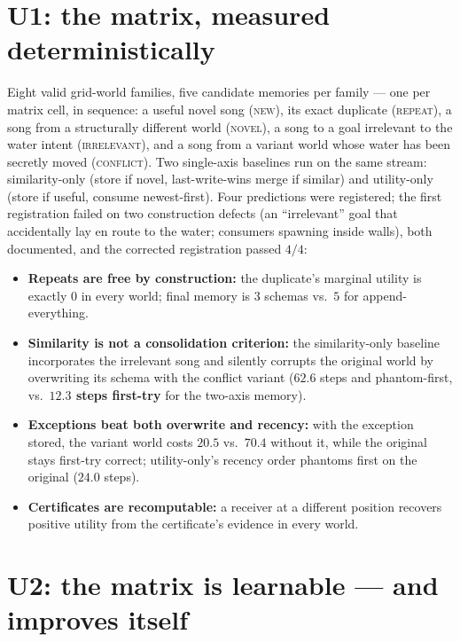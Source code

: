 \documentclass{article}
\begin{document}
\section{U1: the matrix, measured deterministically}
\label{p5:sec:u1}

Eight valid grid-world families, five candidate memories per family
--- one per matrix cell, in sequence: a useful novel song
(\textsc{new}), its exact duplicate (\textsc{repeat}), a song from a
structurally different world (\textsc{novel}), a song to a goal
irrelevant to the water intent (\textsc{irrelevant}), and a song from
a variant world whose water has been secretly moved
(\textsc{conflict}). Two single-axis baselines run on the same
stream: similarity-only (store if novel, last-write-wins merge if
similar) and utility-only (store if useful, consume newest-first).
Four predictions were registered; the first registration failed on
two construction defects (an ``irrelevant'' goal that accidentally
lay en route to the water; consumers spawning inside walls), both
documented, and the corrected registration passed $4/4$:

\begin{itemize}[leftmargin=16pt,itemsep=2pt,topsep=2pt]
\item \textbf{Repeats are free by construction:} the duplicate's
  marginal utility is exactly $0$ in every world; final memory is
  $3$ schemas vs.\ $5$ for append-everything.
\item \textbf{Similarity is not a consolidation criterion:} the
  similarity-only baseline incorporates the irrelevant song and
  silently corrupts the original world by overwriting its schema with
  the conflict variant ($62.6$ steps and phantom-first, vs.\
  \textbf{$12.3$ steps first-try} for the two-axis memory).
\item \textbf{Exceptions beat both overwrite and recency:} with the
  exception stored, the variant world costs $20.5$ vs.\ $70.4$
  without it, while the original stays first-try correct;
  utility-only's recency order phantoms first on the original
  ($24.0$ steps).
\item \textbf{Certificates are recomputable:} a receiver at a
  different position recovers positive utility from the certificate's
  evidence in every world.
\end{itemize}

\section{U2: the matrix is learnable --- and improves itself}
\label{p5:sec:u2}
\end{document}

